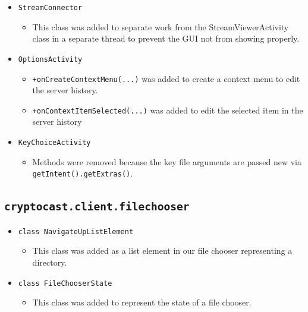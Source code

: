 \documentclass[a4paper,10pt]{scrartcl}
\begin{document}
\begin{itemize}
  \item \lstinline|StreamConnector|
  \begin{itemize}
  \item This class was added to separate work from the StreamViewerActivity class
  in a separate thread to prevent the GUI not from showing properly.
  \end{itemize}

  \item \lstinline|OptionsActivity|
  \begin{itemize}
  \item \lstinline|+onCreateContextMenu(...)| was added to
  create a context menu to edit the server history.
  \item \lstinline|+onContextItemSelected(...)| was added to edit the selected item in the server history
    \end{itemize}

  \item \lstinline|KeyChoiceActivity|
  \begin{itemize}
  \item Methods were removed because the key file arguments are passed new via \lstinline|getIntent().getExtras()|.
  \end{itemize}



\end{itemize}


\subsection{\lstinline|cryptocast.client.filechooser|}

\begin{itemize}

 \item \lstinline|class NavigateUpListElement|
  \begin{itemize}
   \item This class was added as a list element in our file chooser representing a directory.
  \end{itemize}

    \item \lstinline|class FileChooserState|
  \begin{itemize}
   \item This class was added to represent the state of a file chooser.
  \end{itemize}

\end{itemize}
\end{document}
